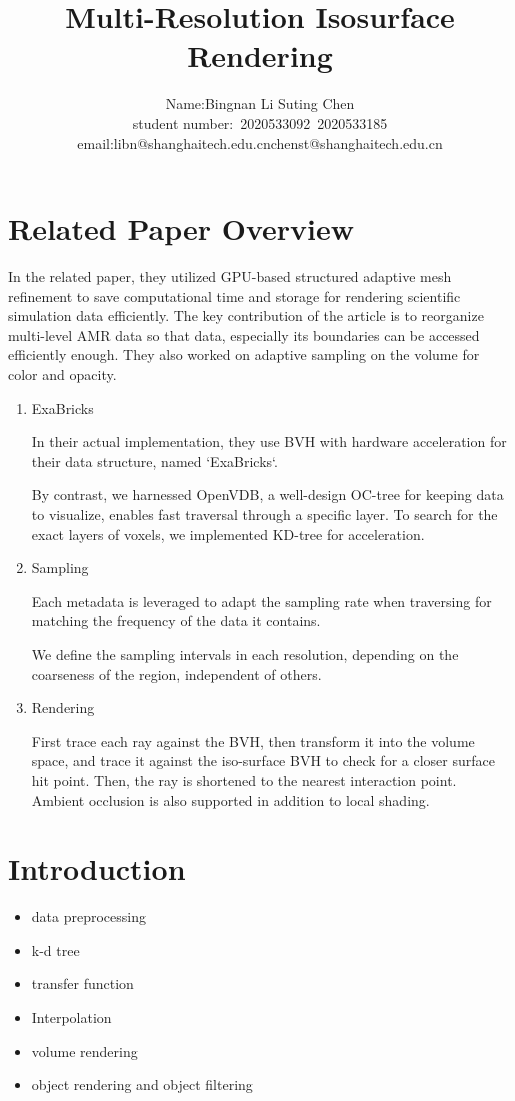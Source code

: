 \documentclass[acmtog]{acmart}
\title{Multi-Resolution Isosurface Rendering}
\author{Name:\quad Bingnan Li \quad Suting Chen \\ student number:\ 2020533092\ 2020533185
\\email:\quad libn@shanghaitech.edu.cn\quad chenst@shanghaitech.edu.cn}
\begin{document}
    \maketitle

    \vspace*{2 ex}


    \section{Related Paper Overview}\label{sec:related-paper-overview}
    In the related paper, they utilized GPU-based structured adaptive mesh refinement to save computational time and storage for rendering scientific simulation data efficiently.
    The key contribution of the article is to reorganize multi-level AMR data so that data, especially its boundaries can be accessed efficiently enough.
    They also worked on adaptive sampling on the volume for color and opacity.
    \begin{enumerate}
        \item ExaBricks
        \par In their actual implementation, they use BVH with hardware acceleration for their data structure, named `ExaBricks`.
        \par By contrast, we harnessed OpenVDB, a well-design OC-tree for keeping data to visualize, enables fast traversal through a specific layer. To search for the exact layers of voxels, we implemented KD-tree for acceleration.
        \item Sampling
        \par Each metadata is leveraged to adapt the sampling rate when traversing for matching the frequency of the data it contains.
        \par We define the sampling intervals in each resolution, depending on the coarseness of the region, independent of others.
        \item Rendering
        \par First trace each ray against the BVH, then transform it into the volume space, and trace it against the iso-surface BVH to check for a closer surface hit point.
        Then, the ray is shortened to the nearest interaction point. Ambient occlusion is also supported in addition to local shading.
    \end{enumerate}


    \section{Introduction}\label{sec:introduction}
    \begin{itemize}
        \item data preprocessing
        \item k-d tree
        \item transfer function
        \item Interpolation
        \item volume rendering
        \item object rendering and object filtering
    \end{itemize}
\end{document}
